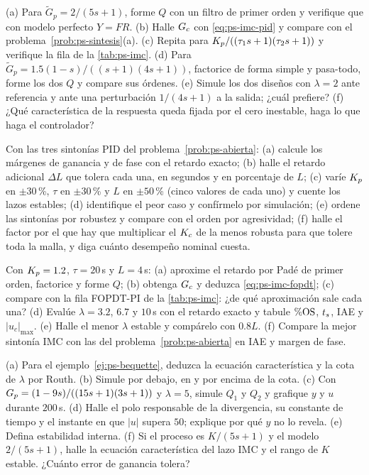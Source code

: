 \begin{problema}\label{prob:ps-imc}
(a) Para $\tilde G_p=2/(5s+1)$, forme $Q$ con un filtro de primer orden y verifique que con modelo perfecto $Y=FR$. (b) Halle $G_c$ con \eqref{eq:ps-imc-pid} y compare con el problema~\ref{prob:ps-sintesis}(a). (c) Repita para $K_p/((\tau_1s+1)(\tau_2s+1))$ y verifique la fila de la \cref{tab:ps-imc}. (d) Para $\tilde G_p=1.5(1-s)/((s+1)(4s+1))$, factorice de forma simple y pasa-todo, forme los dos $Q$ y compare sus órdenes. (e) \etiquetaM{} Simule los dos diseños con $\lambda=2$ ante referencia y ante una perturbación $1/(4s+1)$ a la salida; ¿cuál prefiere? (f) ¿Qué característica de la respuesta queda fijada por el cero inestable, haga lo que haga el controlador?
\end{problema}

\begin{problema}[robustez]\label{prob:ps-robustez}
Con las tres sintonías PID del problema~\ref{prob:ps-abierta}: (a) \etiquetaM{} calcule los márgenes de ganancia y de fase con el retardo exacto; (b) halle el retardo adicional $\Delta L$ que tolera cada una, en segundos y en porcentaje de $L$; (c) \etiquetaM{} varíe $K_p$ en $\pm30$\,\%, $\tau$ en $\pm30$\,\% y $L$ en $\pm50$\,\% (cinco valores de cada uno) y cuente los lazos estables; (d) identifique el peor caso y confírmelo por simulación; (e) ordene las sintonías por robustez y compare con el orden por agresividad; (f) \etiquetaEstrella{} halle el factor por el que hay que multiplicar el $K_c$ de la menos robusta para que tolere toda la malla, y diga cuánto desempeño nominal cuesta.
\end{problema}

\begin{problema}\label{prob:ps-imc-fopdt}
Con $K_p=1.2$, $\tau=20$\,s y $L=4$\,s: (a) aproxime el retardo por Padé de primer orden, factorice y forme $Q$; (b) obtenga $G_c$ y deduzca \eqref{eq:ps-imc-fopdt}; (c) compare con la fila FOPDT-PI de la \cref{tab:ps-imc}: ¿de qué aproximación sale cada una? (d) \etiquetaM{} Evalúe $\lambda=3.2$, $6.7$ y $10$\,s con el retardo exacto y tabule $\%\mathrm{OS}$, $t_s$, IAE y $|u_c|_{\max}$. (e) \etiquetaM{} Halle el menor $\lambda$ estable y compárelo con $0.8L$. (f) Compare la mejor sintonía IMC con las del problema~\ref{prob:ps-abierta} en IAE y margen de fase.
\end{problema}

\begin{problema}\label{prob:ps-interna}
(a) Para el ejemplo~\ref{ej:ps-bequette}, deduzca la ecuación característica y la cota de $\lambda$ por Routh. (b) \etiquetaM{} Simule por debajo, en y por encima de la cota. (c) \etiquetaM{} Con $G_p=(1-9s)/((15s+1)(3s+1))$ y $\lambda=5$, simule $Q_1$ y $Q_2$ y grafique $y$ y $u$ durante $200$\,s. (d) Halle el polo responsable de la divergencia, su constante de tiempo y el instante en que $|u|$ supera $50$; explique por qué $y$ no lo revela. (e) Defina estabilidad interna. (f) Si el proceso es $K/(5s+1)$ y el modelo $2/(5s+1)$, halle la ecuación característica del lazo IMC y el rango de $K$ estable. ¿Cuánto error de ganancia tolera?
\end{problema}

